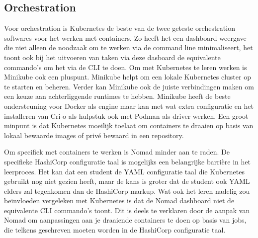 \subsection{Orchestration}

Voor orchestration is Kubernetes de beste van de twee geteste orchestration softwares voor het werken met containers. Zo heeft het een dashboard weergave die niet alleen de noodzaak om te werken via de command line minimaliseert, het toont ook bij het uitvoeren van taken via deze dasboard de equivalente commando’s om het via de CLI te doen. Om met Kubernetes te leren werken is Minikube ook een pluspunt. Minikube helpt om een lokale Kubernetes cluster op te starten en beheren. Verder kan Minikube ook de juiste verbindingen maken om een keuze aan achterliggende runtimes te hebben. Minikube heeft de beste ondersteuning voor Docker als engine maar kan met wat extra configuratie en het installeren van Cri-o als hulpstuk ook met Podman als driver werken. Een groot minpunt is dat Kubernetes moeilijk toelaat om containers te draaien op basis van lokaal bewaarde images of privé bewaard in een repository.

Om specifiek met containers te werken is Nomad minder aan te raden. De specifieke HashiCorp configuratie taal is mogelijks een belangrijke barrière in het leerproces. Het kan dat een student de YAML configuratie taal die Kubernetes gebruikt nog niet gezien heeft, maar de kans is groter dat de student ook YAML elders zal tegenkomen dan de HashiCorp markup. Wat ook het leren nadelig zou beïnvloeden vergeleken met Kubernetes is dat de Nomad dashboard niet de equivalente CLI commando’s toont. Dit is deels te verklaren door de aanpak van Nomad om aanpassingen aan je draaiende containers te doen op basis van jobs, die telkens geschreven moeten worden in de HashiCorp configuratie taal.
